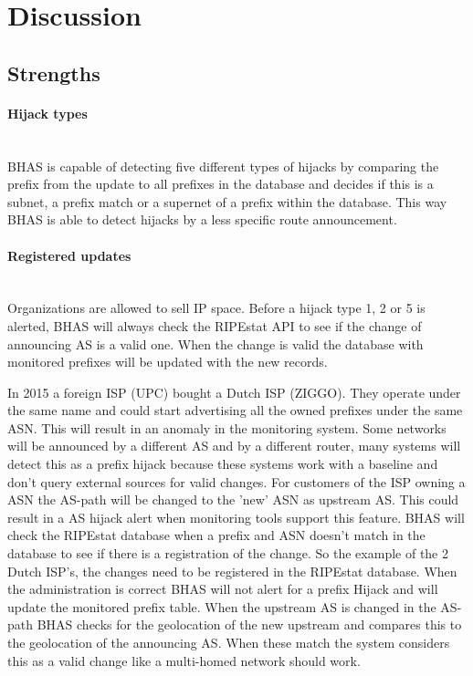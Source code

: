 \section{Discussion}\label{sec:finaldiscussion}
\subsection{Strengths}\label{subsec:strengths}
\paragraph{Hijack types}\label{par:hijacktypes}\mbox{}\\
BHAS is capable of detecting five different types of hijacks by comparing the prefix from the update to all prefixes in the database and decides if this is a subnet, a prefix match or a supernet of a prefix within the database. This way BHAS is able to detect hijacks by a less specific route announcement. \par 

\paragraph{Registered updates}\label{par:registeredupdates}\mbox{}\\
Organizations are allowed to sell IP space. Before a hijack type 1, 2 or 5 is alerted, BHAS will always check the RIPEstat API to see if the change of announcing AS is a valid one. When the change is valid the database with monitored prefixes will be updated with the new records.\par

In 2015 a foreign ISP (UPC) bought a Dutch ISP (ZIGGO). They operate under the same name and could start advertising all the owned prefixes under the same ASN. This will result in an anomaly in the monitoring system. Some networks will be announced by a different AS and by a different router, many systems will detect this as a prefix hijack because these systems work with a baseline and don't query external sources for valid changes. For customers of the ISP owning a ASN the AS-path will be changed to the 'new' ASN as upstream AS. This could result in a AS hijack alert when monitoring tools support this feature. BHAS will check the RIPEstat database when a prefix and ASN doesn't match in the database to see if there is a registration of the change. So the example of the 2 Dutch ISP's, the changes need to be registered in the RIPEstat database. When the administration is correct BHAS will not alert for a prefix Hijack and will update the monitored prefix table. When the upstream AS is changed in the AS-path BHAS checks for the geolocation of the new upstream and compares this to the geolocation of the announcing AS. When these match the system considers this as a valid change like a multi-homed network should work.

